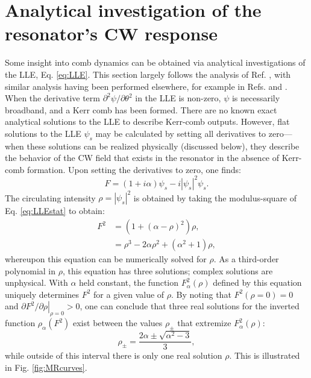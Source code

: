 \section{Analytical investigation of the resonator's CW response}
Some insight into comb dynamics can be obtained via analytical investigations of the LLE, Eq. \ref{eq:LLE}. This section largely follows the analysis of Ref. \cite{Godey2014}, with similar analysis having been performed elsewhere, for example in Refs. \cite{Coen2013a} and \cite{Barashenkov1996}. When the derivative term $\partial^2\psi/\partial\theta^2$ in the LLE is non-zero, $\psi$ is necessarily broadband, and a Kerr comb has been formed. There are no known exact analytical solutions to the LLE to describe Kerr-comb outputs. However, flat solutions to the LLE $\psi_s$ may be calculated by setting all derivatives to zero---when these solutions can be realized physically (discussed below), they describe the behavior of the CW field that exists in the resonator in the absence of Kerr-comb formation. Upon setting the derivatives to zero, one finds:
\begin{equation}
F=(1+i\alpha)\psi_s-i|\psi_s|^2\psi_s. \label{eq:LLEstat}
\end{equation}
The circulating intensity $\rho=|\psi_s|^2$ is obtained by taking the modulus-square of Eq. \ref{eq:LLEstat} to obtain:
\begin{align}
F^2&=\left(1+(\alpha-\rho)^2\right)\rho\label{eq:LLEstat2},\\
&=\rho^3-2\alpha\rho^2+(\alpha^2+1)\rho,
\end{align} 
whereupon this equation can be numerically solved for $\rho$. As a third-order polynomial in $\rho$, this equation has three solutions; complex solutions are unphysical. With $\alpha$ held constant, the function $F^2_\alpha(\rho)$ defined by this equation uniquely determines $F^2$ for a given value of $\rho$. By noting that $F^2(\rho=0)=0$ and $\left.\partial F^2/\partial \rho\right|_{\rho=0}>0$, one can conclude that three real solutions for the inverted function $\rho_\alpha(F^2)$ exist between the values $\rho_\pm$ that extremize $F^2_\alpha(\rho)$:
\begin{equation}
\rho_\pm=\frac{2\alpha\pm\sqrt{\alpha^2-3}}{3},\label{eq:rhopm}
\end{equation}
while outside of this interval there is only one real solution $\rho$. This is illustrated in Fig. \ref{fig:MRcurves}.

